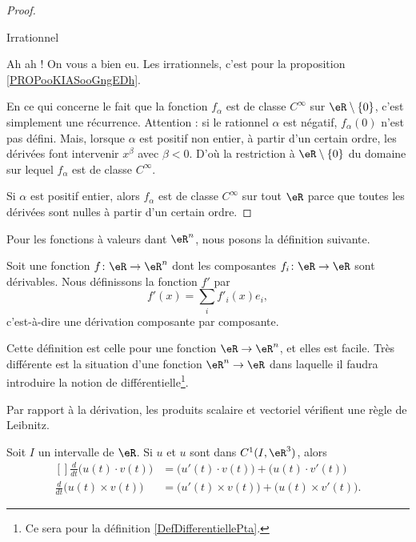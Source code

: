\begin{proof}
\begin{subproof}
        \item[Irrationnel]

            Ah ah ! On vous a bien eu. Les irrationnels, c'est pour la proposition \ref{PROPooKIASooGngEDh}.
    \end{subproof}
    En ce qui concerne le fait que la fonction \( f_{\alpha}\) est de classe \(  C^{\infty}\) sur \( \eR\setminus\{ 0 \}\), c'est simplement une récurrence. Attention : si le rationnel \( \alpha\) est négatif, \( f_{\alpha}(0)\) n'est pas défini. Mais, lorsque \( \alpha\) est positif non entier, à partir d'un certain ordre, les dérivées font intervenir \( x^{\beta}\) avec \( \beta<0\). D'où la restriction à \( \eR\setminus\{ 0 \}\) du domaine sur lequel \( f_{\alpha}\) est de classe \(  C^{\infty}\).

    Si \( \alpha\) est positif entier, alors \( f_{\alpha}\) est de classe \(  C^{\infty}\) sur tout \( \eR\) parce que toutes les dérivées sont nulles à partir d'un certain ordre.
\end{proof}


Pour les fonctions à valeurs dant \( \eR^n\), nous posons la définition suivante.
\begin{definition}
    Soit une fonction \( f\colon \eR\to \eR^n\) dont les composantes \( f_i\colon \eR\to \eR\) sont dérivables. Nous définissons la fonction \( f'\) par
    \begin{equation}
        f'(x)=\sum_if'_i(x)e_i,
    \end{equation}
    c'est-à-dire une dérivation composante par composante.
\end{definition}

Cette définition est celle pour une fonction \( \eR\to \eR^n\), et elles est facile. Très différente est la situation d'une fonction \( \eR^n\to \eR\) dans laquelle il faudra introduire la notion de différentielle\footnote{Ce sera pour la définition \ref{DefDifferentiellePta}.}.

Par rapport à la dérivation, les produits scalaire et vectoriel vérifient une règle de Leibnitz. 
\begin{proposition}     \label{PROPooFKKHooQZGXhE}
    Soit $I$ un intervalle de $\eR$. Si $u$ et $u$ sont dans $C^1(I,\eR^3)$, alors
    \begin{equation}		\label{EqFormLeibProdscalVect}
        \begin{aligned}[]
            \frac{ d }{ dt }\big( u(t)\cdot v(t) \big)&=\big( u'(t)\cdot v(t) \big)+\big( u(t)\cdot v'(t) \big)\\
            \frac{ d }{ dt }\big( u(t)\times v(t) \big)&=\big( u'(t)\times v(t) \big)+\big( u(t)\times v'(t) \big).
        \end{aligned}
    \end{equation}
\end{proposition}

